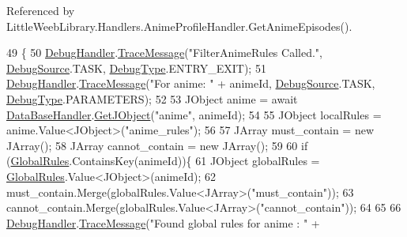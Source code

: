 Referenced by Little\+Weeb\+Library.\+Handlers.\+Anime\+Profile\+Handler.\+Get\+Anime\+Episodes().


\begin{DoxyCode}
49         \{
50             \mbox{\hyperlink{class_little_weeb_library_1_1_handlers_1_1_anime_rule_handler_a6ad89134d97d818f3b2deebb7e2cf361}{DebugHandler}}.\mbox{\hyperlink{interface_little_weeb_library_1_1_handlers_1_1_i_debug_handler_a2e405bc3492e683cd3702fae125221bc}{TraceMessage}}(\textcolor{stringliteral}{"FilterAnimeRules Called."}, 
      \mbox{\hyperlink{namespace_little_weeb_library_1_1_handlers_a2a6ca0775121c9c503d58aa254d292be}{DebugSource}}.TASK, \mbox{\hyperlink{namespace_little_weeb_library_1_1_handlers_ab66019ed40462876ec4e61bb3ccb0a62}{DebugType}}.ENTRY\_EXIT);
51             \mbox{\hyperlink{class_little_weeb_library_1_1_handlers_1_1_anime_rule_handler_a6ad89134d97d818f3b2deebb7e2cf361}{DebugHandler}}.\mbox{\hyperlink{interface_little_weeb_library_1_1_handlers_1_1_i_debug_handler_a2e405bc3492e683cd3702fae125221bc}{TraceMessage}}(\textcolor{stringliteral}{"For anime: "} + animeId, 
      \mbox{\hyperlink{namespace_little_weeb_library_1_1_handlers_a2a6ca0775121c9c503d58aa254d292be}{DebugSource}}.TASK, \mbox{\hyperlink{namespace_little_weeb_library_1_1_handlers_ab66019ed40462876ec4e61bb3ccb0a62}{DebugType}}.PARAMETERS);
52 
53             JObject anime = await \mbox{\hyperlink{class_little_weeb_library_1_1_handlers_1_1_anime_rule_handler_a31322132913e3f4b669e14a3e621a326}{DataBaseHandler}}.\mbox{\hyperlink{interface_little_weeb_library_1_1_handlers_1_1_i_data_base_handler_a6586c4d1cfebdb8d5d40bc544d51914c}{GetJObject}}(\textcolor{stringliteral}{"anime"}, animeId);
54 
55             JObject localRules = anime.Value<JObject>(\textcolor{stringliteral}{"anime\_rules"});
56 
57             JArray must\_contain = \textcolor{keyword}{new} JArray();
58             JArray cannot\_contain = \textcolor{keyword}{new} JArray();
59 
60             \textcolor{keywordflow}{if} (\mbox{\hyperlink{class_little_weeb_library_1_1_handlers_1_1_anime_rule_handler_aff5df38f10696987486267a30095ad49}{GlobalRules}}.ContainsKey(animeId))\{
61                 JObject globalRules = \mbox{\hyperlink{class_little_weeb_library_1_1_handlers_1_1_anime_rule_handler_aff5df38f10696987486267a30095ad49}{GlobalRules}}.Value<JObject>(animeId);
62                 must\_contain.Merge(globalRules.Value<JArray>(\textcolor{stringliteral}{"must\_contain"}));
63                 cannot\_contain.Merge(globalRules.Value<JArray>(\textcolor{stringliteral}{"cannot\_contain"}));
64 
65 
66                 \mbox{\hyperlink{class_little_weeb_library_1_1_handlers_1_1_anime_rule_handler_a6ad89134d97d818f3b2deebb7e2cf361}{DebugHandler}}.\mbox{\hyperlink{interface_little_weeb_library_1_1_handlers_1_1_i_debug_handler_a2e405bc3492e683cd3702fae125221bc}{TraceMessage}}(\textcolor{stringliteral}{"Found global rules for anime : "} + 

\end{DoxyCode}
